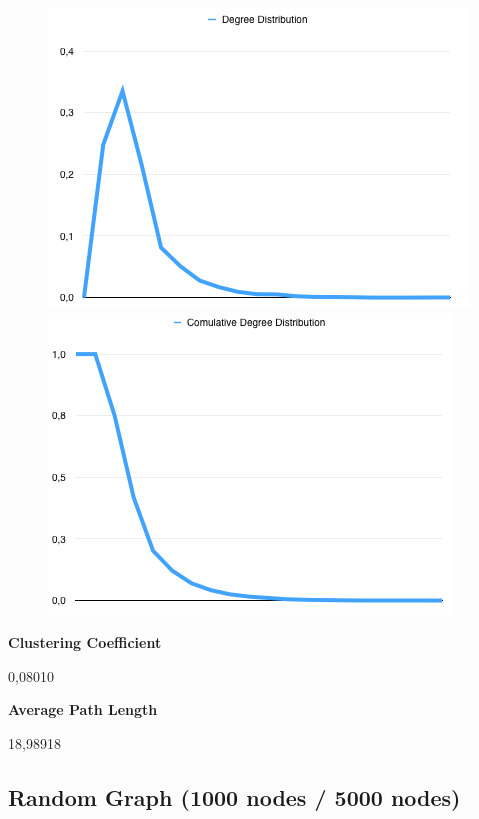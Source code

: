 \documentclass[a4paper,titlepage,11pt]{article}
\begin{document}
\begin{figure}[h]
    \centering
    \includegraphics[scale=0.50]{img/dd-dataset.png}
    \includegraphics[scale=0.50]{img/cdd-dataset.png}
\end{figure}

\begin{multicols}{2}

  \textbf{Clustering Coefficient}

  0,08010

\columnbreak

  \textbf{Average Path Length}

  18,98918


\end{multicols}

\subsection{Random Graph (1000 nodes / 5000 nodes)}
\end{document}

